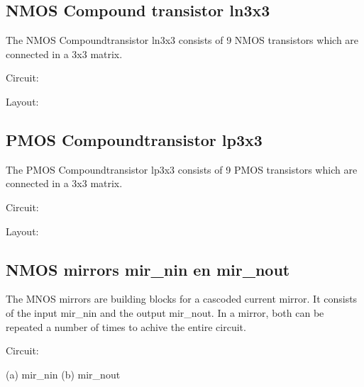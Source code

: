 \subsection {NMOS Compound transistor ln3x3}

The NMOS Compoundtransistor ln3x3 consists of 9 NMOS transistors
which are connected in a 3x3 matrix.

Circuit:
\begin{figure}[h]
\centerline{}
\end{figure}

Layout:
\begin{figure}[h]
\centerline{}
\end{figure}

\clearpage


\subsection {PMOS Compoundtransistor lp3x3}
The PMOS Compoundtransistor lp3x3 consists of 9 PMOS transistors
which are connected in a 3x3 matrix.

Circuit:
\begin{figure}[h]
\centerline{}
\end{figure}

Layout:
\begin{figure}[h]
\centerline{}
\end{figure}

\clearpage


\subsection {NMOS mirrors mir\_nin en mir\_nout}

The MNOS mirrors are building blocks for a cascoded current mirror.
It consists of the input mir\_nin and the output mir\_nout.
In a mirror, both can be repeated a number of times to achive the
entire circuit.

Circuit:\\
\medskip
\begin{figure}[h]
\centerline{}
\end{figure}
(a) mir\_nin (b) mir\_nout
\newpage


